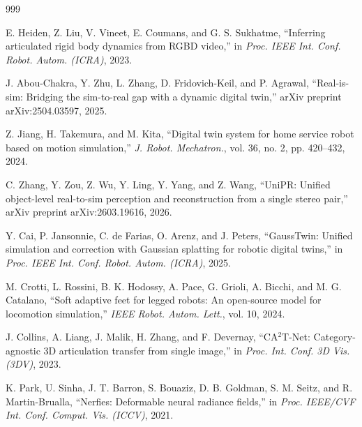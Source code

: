\documentclass[12pt,a4paper,oneside]{report}
\begin{document}
\begin{thebibliography}{999}

E. Heiden, Z. Liu, V. Vineet, E. Coumans, and G. S. Sukhatme, ``Inferring articulated rigid body dynamics from RGBD video,'' in \textit{Proc. IEEE Int. Conf. Robot. Autom. (ICRA)}, 2023.




J. Abou-Chakra, Y. Zhu, L. Zhang, D. Fridovich-Keil, and P. Agrawal, ``Real-is-sim: Bridging the sim-to-real gap with a dynamic digital twin,'' arXiv preprint arXiv:2504.03597, 2025.




Z. Jiang, H. Takemura, and M. Kita, ``Digital twin system for home service robot based on motion simulation,'' \textit{J. Robot. Mechatron.}, vol. 36, no. 2, pp. 420--432, 2024.




C. Zhang, Y. Zou, Z. Wu, Y. Ling, Y. Yang, and Z. Wang, ``{UniPR}: Unified object-level real-to-sim perception and reconstruction from a single stereo pair,'' arXiv preprint arXiv:2603.19616, 2026.




Y. Cai, P. Jansonnie, C. de Farias, O. Arenz, and J. Peters, ``{GaussTwin}: Unified simulation and correction with Gaussian splatting for robotic digital twins,'' in \textit{Proc. IEEE Int. Conf. Robot. Autom. (ICRA)}, 2025.




M. Crotti, L. Rossini, B. K. Hodossy, A. Pace, G. Grioli, A. Bicchi, and M. G. Catalano, ``Soft adaptive feet for legged robots: An open-source model for locomotion simulation,'' \textit{IEEE Robot. Autom. Lett.}, vol. 10, 2024.




J. Collins, A. Liang, J. Malik, H. Zhang, and F. Devernay, ``{CA}$^2${T}-Net: Category-agnostic 3D articulation transfer from single image,'' in \textit{Proc. Int. Conf. 3D Vis. (3DV)}, 2023.




K. Park, U. Sinha, J. T. Barron, S. Bouaziz, D. B. Goldman, S. M. Seitz, and R. Martin-Brualla, ``Nerfies: Deformable neural radiance fields,'' in \textit{Proc. IEEE/CVF Int. Conf. Comput. Vis. (ICCV)}, 2021.




\end{thebibliography}
\end{document}
